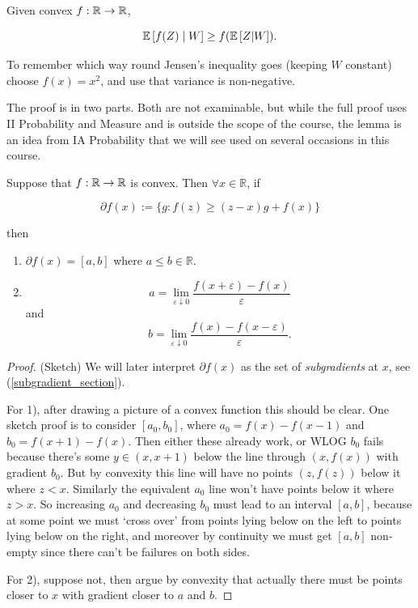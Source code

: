 \documentclass[11pt]{scrartcl}
\begin{document}
\begin{theorem}
Given convex $f:\mathbb R \rightarrow \mathbb R$,

\begin{equation}
    \mathbb{E} \left[ f(Z) \mid W \right] \ge f(\mathbb{E} \left[ Z|W \right]).
\end{equation}
\end{theorem}

\begin{remark}
To remember which way round Jensen's inequality goes (keeping $W$ constant) choose $f(x)=x^2$, and use that variance is non-negative.
\end{remark}

The proof is in two parts. Both are not examinable, but while the full proof uses II Probability and Measure and is outside the scope of the course, the lemma is an idea from IA Probability that we will see used on several occasions in this course.

\begin{lemma}
Suppose that $f : \mathbb R \to \mathbb R$ is convex. Then $\forall x \in \mathbb{ R}$, if 

\begin{equation}
\partial f(x) := \{ g : f(z) \ge (z-x)g + f(x) \}
\end{equation}

then 
\begin{enumerate}
\item $\partial f(x) = [a, b]$ where $a \le b \in \mathbb{ R}$.
\item \begin{equation}
    a = \lim_{\varepsilon \downarrow 0} \frac{f(x+\varepsilon ) - f(x)}{\varepsilon }
\end{equation}
and 
\begin{equation}
    b = \lim_{\varepsilon \downarrow 0} \frac{f(x) - f(x-\varepsilon )}{\varepsilon }.   
\end{equation}
\end{enumerate}

\begin{proof}(Sketch)
We will later interpret $\partial f(x)$ as the set of \textit{subgradients} at $x$, see (\ref{subgradient_section}).

For 1), after drawing a picture of a convex function this should be clear. One sketch proof is to consider $[a_0, b_0]$, where $a_0 = f(x) - f(x-1)$ and $b_0 = f(x+1) - f(x)$. Then either these already work, or WLOG $b_0$ fails because there's some $y \in (x, x+1)$ below the line through $(x,f(x))$ with gradient $b_0$. But by convexity this line will have no points $(z, f(z))$ below it where $z<x$. Similarly the equivalent $a_0$ line won't have points below it where $z>x$. So increasing $a_0$ and decreasing $b_0$ must lead to an interval $[a,b]$, because at some point we must `cross over' from points lying below on the left to points lying below on the right, and moreover by continuity we must get $[a,b]$ non-empty since there can't be failures on both sides.

For 2), suppose not, then argue by convexity that actually there must be points closer to $x$ with gradient closer to $a$ and $b$.
\end{proof}
\end{lemma}
\end{document}
